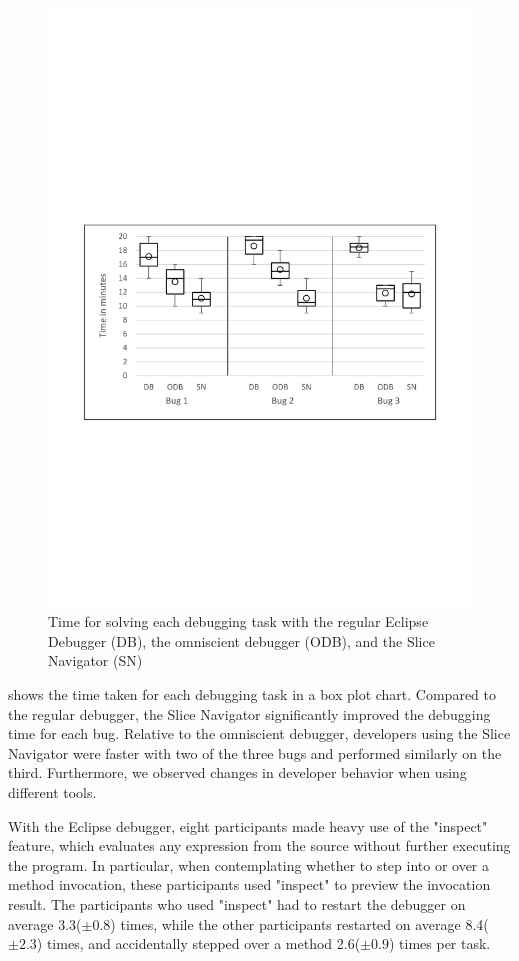 \documentclass[
			english,
			review,
			]{elsarticle}
\begin{document}
\begin{figure}
	\centering
		\includegraphics[width=\linewidth, clip, trim={20mm 104mm 20mm 114mm}]{chart-times2.pdf}
	\caption{Time for solving each debugging task with the regular Eclipse Debugger (DB), the omniscient debugger (ODB), and the Slice Navigator (SN)}
	\label{fig:charttimes}
\end{figure}

 shows the time taken for each debugging task in a box plot chart.
Compared to the regular debugger, the Slice Navigator significantly improved the debugging time for each bug.
Relative to the omniscient debugger, developers using the Slice Navigator were faster with two of the three bugs and performed similarly on the third.
Furthermore, we observed changes in developer behavior when using different tools.

With the Eclipse debugger, eight participants made heavy use of the "inspect" feature, which evaluates any expression from the source without further executing the program.
In particular, when contemplating whether to step into or over a method invocation, these participants used "inspect" to preview the invocation result.
The participants who used "inspect" had to restart the debugger on average 3.3($\pm0.8$) times, while the other participants restarted on average 8.4($\pm2.3$) times, and accidentally stepped over a method 2.6($\pm0.9$) times per task.
\end{document}
